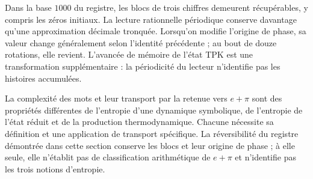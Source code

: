 Dans la base $1000$ du registre, les blocs de trois chiffres demeurent
récupérables, y compris les zéros initiaux. La lecture rationnelle
périodique conserve davantage qu'une approximation décimale tronquée.
Lorsqu'on modifie l'origine de phase, sa valeur change généralement selon
l'identité précédente ; au bout de douze rotations, elle revient.
L'avancée de mémoire de l'état TPK est une transformation supplémentaire :
la périodicité du lecteur n'identifie pas les histoires accumulées.

\begin{remark}
La complexité des mots et leur transport par la retenue vers
$e+\pi$ sont des propriétés différentes de l’entropie d’une dynamique
symbolique, de l’entropie de l’état réduit et de la production thermodynamique.
Chacune nécessite sa définition et une application de transport spécifique.
La réversibilité du registre démontrée dans cette section conserve
les blocs et leur origine de phase ; à elle seule, elle n’établit pas de
classification arithmétique de $e+\pi$ et n’identifie pas les trois notions
d’entropie.
\end{remark}
